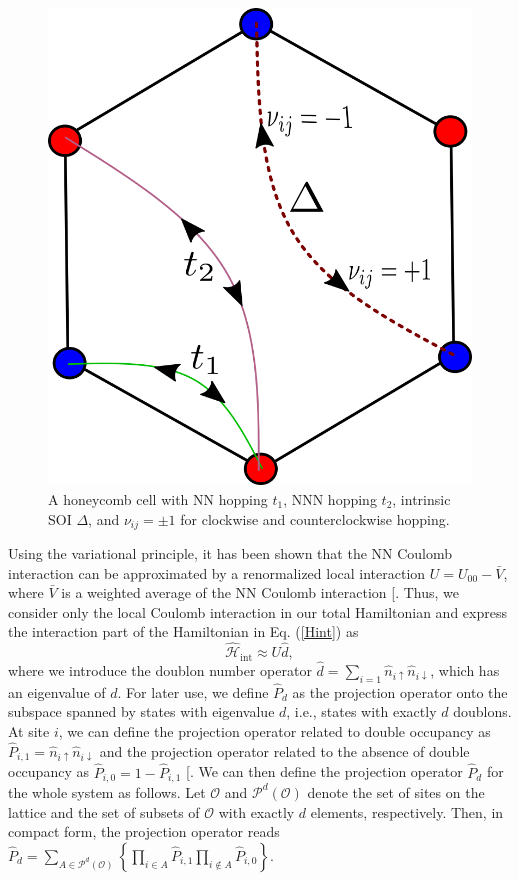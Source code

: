 \documentclass[aps,prl,twocolumn,amsmath,amssymb,nobibnotes]{revtex4-1}%
\renewcommand{\cite}[1]{{[}\onlinecite{#1}{]}}
\begin{document}
\begin{figure}[t]
\centering
\includegraphics[width=0.6\columnwidth]{kmh.png}
\caption{A honeycomb cell with NN hopping $t_1$, NNN hopping $t_2$, intrinsic SOI $\Delta$, and $\nu_{ij} = \pm 1$ for clockwise and counterclockwise hopping.}
\label{fig1}
\vspace*{-6pt}
\end{figure}

Using the variational principle, it has been shown that the NN Coulomb interaction can be approximated by a renormalized local interaction $U =U_{00} - \bar{V}$, where $\bar{V}$ is a weighted average of the NN Coulomb interaction \cite{Schuler2013}. Thus, we consider only the local Coulomb interaction in our total Hamiltonian and express the interaction part of the Hamiltonian in Eq. (\ref{Hint}) as
\begin{equation}
\hat{\mathcal{H}}_{\text{int}} \approx U\hat{d},
\end{equation}
where we introduce the doublon number operator $\hat{d} = \sum_{i=1} \hat{n}_{i\uparrow}\hat{n}_{i\downarrow}$, which has an eigenvalue of $d$.
For later use, we define $\hat{P}_d$ as the projection operator onto the subspace spanned by states with eigenvalue $d$, i.e., states with exactly $d$ doublons. At site $i$, we can define the projection operator related to double occupancy as $\hat{P}_{i,1} = \hat{n}_{i\uparrow}\hat{n}_{i\downarrow}$ and the projection operator related to the absence of double occupancy as $\hat{P}_{i,0} = 1 - \hat{P}_{i,1}$ \cite{Fazekas}. We can then define the projection operator $\hat{P}_{d}$ for the whole system as follows. Let $\mathcal{O}$ and $\mathcal{P}^d(\mathcal{O})$ denote the set of sites on the lattice and the set of subsets of $\mathcal{O}$ with exactly $d$ elements, respectively. Then, in compact form, the projection operator reads $\hat{P}_d = \sum_{A \in \mathcal{P}^d(\mathcal{O})} \left\{\prod_{i \in A} \hat{P}_{i,1} \prod_{i \notin A} \hat{P}_{i,0} \right\}$.
\end{document}
